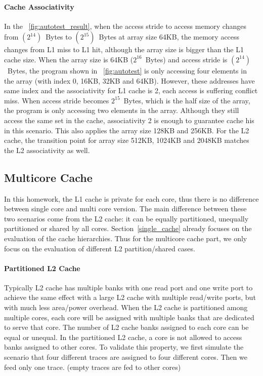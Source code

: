 \documentclass[12pt]{report}
\newcommand{\Fig}[1]{\figurename~\ref{#1}}
\newcommand{\Sec}[1]{Section~\ref{#1}}
\begin{document}
\paragraph{Cache Associativity}
In the \Fig{fig:autotest_result}, when the access stride to access memory changes from $(2^{14})$~Bytes to $(2^{15})$~Bytes at array size 64KB, the memory access changes from L1 miss to L1 hit, although the array size is bigger than the L1 cache size. When the array size is 64KB ($2^{16}$~Bytes) and access stride is $(2^{14})$~Bytes, the program shown in \Fig{fig:autotest} is only accessing four elements in the array (with index 0, 16KB, 32KB and 64KB). However, these addresses have same index and the associativity for L1 cache is 2, each access is suffering conflict miss. When access stride becomes $2^{15}$~Bytes, which is the half size of the array, the program is only accessing two elements in the array. Although they still access the same set in the cache, associativity 2 is enough to guarantee cache his in this scenario. This also applies the array size 128KB and 256KB. For the L2 cache, the transition point for array size 512KB, 1024KB and 2048KB matches the L2 associativity as well.

\subsection{Multicore Cache}
\label{sec:multi_cache}

In this homework, the L1 cache is private for each core, thus there is no difference between single core and multi core version. The main difference between these two scenarios come from the L2 cache: it can be equally partitioned, unequally partitioned or shared by all cores. \Sec{single_cache} already focuses on the evaluation of the cache hierarchies. Thus for the multicore cache part, we only focus on the evaluation of different L2 partition/shared cases.

\paragraph{Partitioned L2 Cache}
Typically L2 cache has multiple banks with one read port and one write port to achieve the same effect with a large L2 cache with multiple read/write ports, but with much less area/power overhead. When the L2 cache is partitioned among multiple cores, each core will be assigned with multiple banks that are dedicated to serve that core. The number of L2 cache banks assigned to each core can be equal or unequal. In the partitioned L2 cache, a core is not allowed to access banks assigned to other cores. To validate this property, we first simulate the scenario that four different traces are assigned to four different cores. Then we feed only one trace. (empty traces are fed to other cores)
\end{document}

